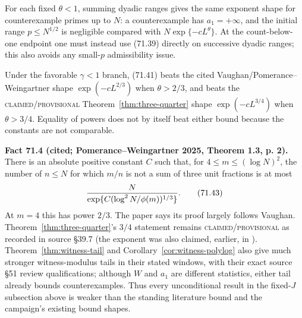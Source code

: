 \documentclass[10pt,reqno]{amsart}
\theoremstyle{definition}
\newcommand{\1}{\mathbf 1}
\begin{document}
For each fixed $\theta<1$, summing dyadic ranges gives the same exponent
shape for counterexample primes up to $N$: a counterexample has
$a_1=+\infty$, and the initial range $p\leq N^{1/2}$ is negligible compared
with $N\exp\{-cL^\theta\}$.  At the count-below-one endpoint one must instead
use (71.39) directly on successive dyadic ranges; this also avoids any
small-$p$ admissibility issue.

Under the favorable $\gamma<1$ branch, (71.41) beats the cited
Vaughan/Pomerance--Weingartner shape $\exp(-cL^{2/3})$ when
$\theta>2/3$, and beats the \textsc{claimed/provisional} Theorem~\ref{thm:three-quarter} shape
$\exp(-cL^{3/4})$ when $\theta>3/4$.  Equality of powers does not
by itself beat either bound because the constants are not comparable.

\medskip\noindent\textbf{Fact 71.4 (cited; Pomerance--Weingartner 2025, Theorem 1.3, p. 2).}
There is an absolute positive constant $C$ such that, for
$4\leq m\leq(\log N)^2$, the number of $n\leq N$ for which $m/n$ is
not a sum of three unit fractions is at most
\begin{equation}
 {N\over\exp\{C(\log^2N/\phi(m))^{1/3}\}}.               \tag{71.43}
\end{equation}
At $m=4$ this has power $2/3$.  The paper says its proof largely
follows Vaughan.  Theorem~\ref{thm:three-quarter}'s $3/4$ statement remains
\textsc{claimed/provisional} as recorded in source \S39.7 (the exponent was
also claimed, earlier, in \cite{KRK}).  Theorem~\ref{thm:witness-tail} and
Corollary~\ref{cor:witness-polylog} also give much stronger witness-modulus tails in their stated windows,
with their exact source \S51 review qualifications; although $W$ and $a_1$ are
different statistics, either tail already bounds counterexamples.  Thus
every unconditional result in the fixed-$J$ subsection above is weaker than the standing literature
bound and the campaign's existing bound shapes.
\end{document}
